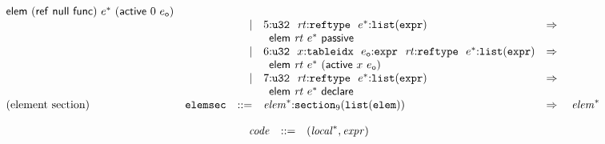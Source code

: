 $$\begin{array}[t]{@{}lrrl@{}l@{}l@{}l@{}}
{\begin{array}[t]{@{}l@{}}
\mathsf{elem}~(\mathsf{ref}~\mathsf{null}~\mathsf{func})~{e^\ast}~(\mathsf{active}~0~e_{\mathsf{o}}) \\
\end{array}
} \\
& & | & 5{:}{\mathtt{u32}}~~{\mathit{rt}}{:}{\mathtt{reftype}}~~{e^\ast}{:}{\mathtt{list}}({\mathtt{expr}}) & \quad\Rightarrow\quad{} & & \\
&&& \multicolumn{4}{@{}l@{}}{\quad
\begin{array}[t]{@{}l@{}}
\mathsf{elem}~{\mathit{rt}}~{e^\ast}~\mathsf{passive} \\
\end{array}
} \\
& & | & 6{:}{\mathtt{u32}}~~x{:}{\mathtt{tableidx}}~~e_{\mathsf{o}}{:}{\mathtt{expr}}~~{\mathit{rt}}{:}{\mathtt{reftype}}~~{e^\ast}{:}{\mathtt{list}}({\mathtt{expr}}) & \quad\Rightarrow\quad{} & & \\
&&& \multicolumn{4}{@{}l@{}}{\quad
\begin{array}[t]{@{}l@{}}
\mathsf{elem}~{\mathit{rt}}~{e^\ast}~(\mathsf{active}~x~e_{\mathsf{o}}) \\
\end{array}
} \\
& & | & 7{:}{\mathtt{u32}}~~{\mathit{rt}}{:}{\mathtt{reftype}}~~{e^\ast}{:}{\mathtt{list}}({\mathtt{expr}}) & \quad\Rightarrow\quad{} & & \\
&&& \multicolumn{4}{@{}l@{}}{\quad
\begin{array}[t]{@{}l@{}}
\mathsf{elem}~{\mathit{rt}}~{e^\ast}~\mathsf{declare} \\
\end{array}
} \\
\mbox{(element section)} & {\mathtt{elemsec}} & ::= & {{\mathit{elem}}^\ast}{:}{{\mathtt{section}}}_{9}({\mathtt{list}}({\mathtt{elem}})) & \quad\Rightarrow\quad{} & {{\mathit{elem}}^\ast} \\
\end{array}
$$

\vspace{1ex}

$$
\begin{array}[t]{@{}lrrl@{}l@{}}
& {\mathit{code}} & ::= & ({{\mathit{local}}^\ast}, {\mathit{expr}}) \\
\end{array}
$$

